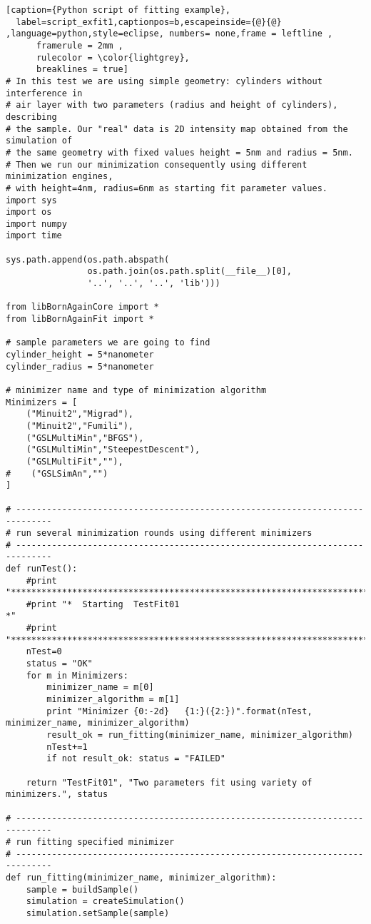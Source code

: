 \begin{lstlisting}[caption={Python script of fitting example},
  label=script_exfit1,captionpos=b,escapeinside={@}{@} ,language=python,style=eclipse, numbers= none,frame = leftline ,
      framerule = 2mm ,
      rulecolor = \color{lightgrey},
      breaklines = true]
# In this test we are using simple geometry: cylinders without interference in
# air layer with two parameters (radius and height of cylinders), describing
# the sample. Our "real" data is 2D intensity map obtained from the simulation of
# the same geometry with fixed values height = 5nm and radius = 5nm.
# Then we run our minimization consequently using different minimization engines,
# with height=4nm, radius=6nm as starting fit parameter values.
import sys
import os
import numpy
import time

sys.path.append(os.path.abspath(
                os.path.join(os.path.split(__file__)[0],
                '..', '..', '..', 'lib')))

from libBornAgainCore import *
from libBornAgainFit import *

# sample parameters we are going to find
cylinder_height = 5*nanometer
cylinder_radius = 5*nanometer

# minimizer name and type of minimization algorithm
Minimizers = [ 
    ("Minuit2","Migrad"), 
    ("Minuit2","Fumili"), 
    ("GSLMultiMin","BFGS"),
    ("GSLMultiMin","SteepestDescent"),
    ("GSLMultiFit",""),
#    ("GSLSimAn","")
]

# -----------------------------------------------------------------------------
# run several minimization rounds using different minimizers
# -----------------------------------------------------------------------------
def runTest():
    #print "**********************************************************************"
    #print "*  Starting  TestFit01                                               *"
    #print "**********************************************************************"
    nTest=0
    status = "OK"
    for m in Minimizers:
        minimizer_name = m[0]
        minimizer_algorithm = m[1]
        print "Minimizer {0:-2d}   {1:}({2:})".format(nTest, minimizer_name, minimizer_algorithm)
        result_ok = run_fitting(minimizer_name, minimizer_algorithm)
        nTest+=1
        if not result_ok: status = "FAILED"

    return "TestFit01", "Two parameters fit using variety of minimizers.", status

# -----------------------------------------------------------------------------
# run fitting specified minimizer
# -----------------------------------------------------------------------------
def run_fitting(minimizer_name, minimizer_algorithm):
    sample = buildSample()
    simulation = createSimulation()
    simulation.setSample(sample)


\end{lstlisting}
